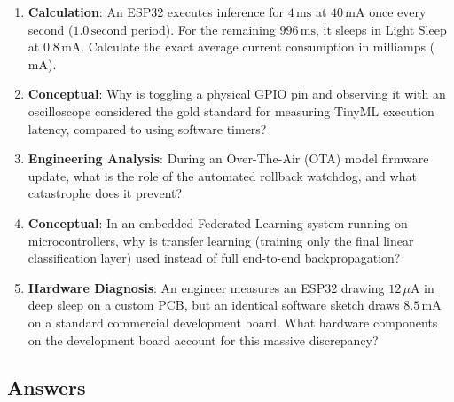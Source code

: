 \begin{checkyourself}
\begin{enumerate}
    \item \textbf{Calculation}: An ESP32 executes inference for $4\,\text{ms}$ at $40\,\text{mA}$ once every second ($1.0\,\text{second}$ period). For the remaining $996\,\text{ms}$, it sleeps in Light Sleep at $0.8\,\text{mA}$. Calculate the exact average current consumption in milliamps ($\text{mA}$).
    \item \textbf{Conceptual}: Why is toggling a physical GPIO pin and observing it with an oscilloscope considered the gold standard for measuring TinyML execution latency, compared to using software timers?
    \item \textbf{Engineering Analysis}: During an Over-The-Air (OTA) model firmware update, what is the role of the automated rollback watchdog, and what catastrophe does it prevent?
    \item \textbf{Conceptual}: In an embedded Federated Learning system running on microcontrollers, why is transfer learning (training only the final linear classification layer) used instead of full end-to-end backpropagation?
    \item \textbf{Hardware Diagnosis}: An engineer measures an ESP32 drawing $12\,\mu\text{A}$ in deep sleep on a custom PCB, but an identical software sketch draws $8.5\,\text{mA}$ on a standard commercial development board. What hardware components on the development board account for this massive discrepancy?
\end{enumerate}
\end{checkyourself}

\subsection*{Answers}

